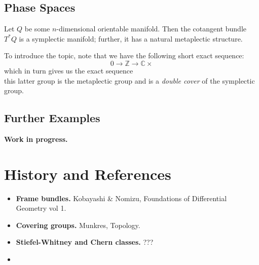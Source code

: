 \documentclass{tufte-handout}
\begin{document}
\subsection{Phase Spaces} %
Let $Q$ be some $n$-dimensional orientable manifold. Then the cotangent bundle $T^*Q$ is a symplectic manifold; further, it has a natural metaplectic structure.

To introduce the topic, note that we have the following short exact sequence:
$$
0 \to \mathbb{Z} \to \mathbb{C} \times 
$$
which in turn gives us the exact sequence
$$
$$
this latter group is the metaplectic group and is a \emph{double cover} of the symplectic group.

\subsection{Further Examples}
\textbf{Work in progress.}

\section{History and References}
\begin{itemize}
\item \textbf{Frame bundles.} Kobayashi \& Nomizu, Foundations of Differential Geometry vol 1.
\item \textbf{Covering groups.} Munkres, Topology.
\item \textbf{Stiefel-Whitney and Chern classes.} ???
\item \textbf{}
\end{itemize}
\end{document}
